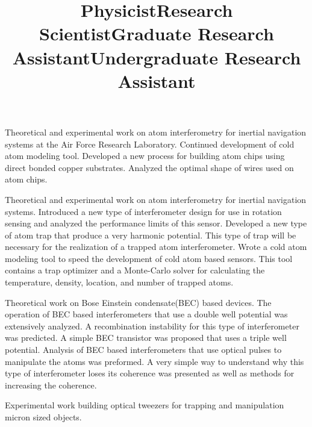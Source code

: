 \documentclass[overlapped,line,letterpaper]{res}
\begin{document}
\begin{resume}
\title{Physicist}
\begin{position}
Theoretical and experimental work on atom interferometry for inertial navigation systems at the Air Force Research
Laboratory.  Continued development of cold atom modeling tool.  Developed a new process for building atom chips using direct bonded copper substrates.  Analyzed the
optimal shape of wires used on atom chips.  
 \end{position}



\title{Research Scientist}
\begin{position}
 Theoretical and experimental work on atom interferometry for inertial navigation systems.  Introduced a new type of
 interferometer design for use in rotation sensing and analyzed the performance limits of this sensor.  Developed a new
 type of atom trap that produce a very harmonic potential.  This type of trap will be necessary for the realization
 of a trapped atom interferometer.  Wrote a cold atom modeling tool to speed the development of cold atom based
 sensors.  This tool contains a trap optimizer and a Monte-Carlo solver for calculating the temperature, density,
 location, and number of trapped atoms.  
\end{position}


\title{Graduate Research Assistant}
\begin{position}
 Theoretical work on Bose Einstein condensate(BEC) based devices.  The operation of BEC based interferometers that use a double well potential was
 extensively analyzed.  A recombination instability for this type of interferometer was predicted.  A simple BEC
 transistor was proposed that uses a triple well potential.  Analysis of BEC based interferometers that use optical
 pulses to manipulate the atoms was preformed.  A very simple way to understand why this type of interferometer loses
 its coherence was presented as well as methods for increasing the coherence.  
\end{position}


\title{Undergraduate Research Assistant}
\begin{position}
  Experimental work building optical tweezers for trapping and manipulation micron sized objects. 
\end{position}








\end{resume}
\end{document}
